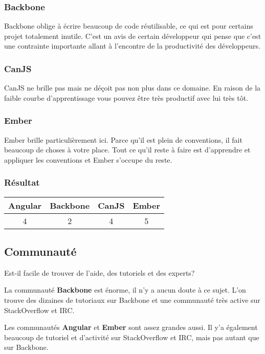 \subsubsection{Backbone}


Backbone oblige à écrire beaucoup de code réutilisable, ce qui est pour certains projet totalement inutile. C’est un avis de certain développeur qui pense que c’est une contrainte importante allant à l’encontre de la productivité des développeurs.

\subsubsection{CanJS}

CanJS ne brille pas mais ne déçoit pas non plus dans ce domaine. En raison de la faible courbe d’apprentissage vous pouvez être très productif avec lui très tôt.


\subsubsection{Ember}

Ember brille particulièrement ici. Parce qu’il est plein de conventions, il fait beaucoup de choses à votre place. Tout ce qu’il reste à faire est d’apprendre et appliquer les conventions et Ember s’occupe du reste.




\subsubsection{Résultat}
\begin{tabular}{|c|c|c|c|}
  \hline 
  Angular & Backbone & CanJS & Ember \\
  \hline 
  4 & 2 & 4 & 5 \\
  \hline
\end{tabular}

\subsection{Communauté}

Est-il facile de trouver de l’aide, des tutoriels et des experts?

La communauté \textbf{Backbone} est énorme, il n’y a aucun doute à ce sujet. L’on trouve des dizaines de tutoriaux sur Backbone et une communauté très active sur StackOverflow et IRC.

Les communautés \textbf{Angular} et \textbf{Ember} sont assez grandes aussi. Il y’a également beaucoup de tutoriel et d’activité sur StackOverflow et IRC, mais pas autant que sur Backbone.

